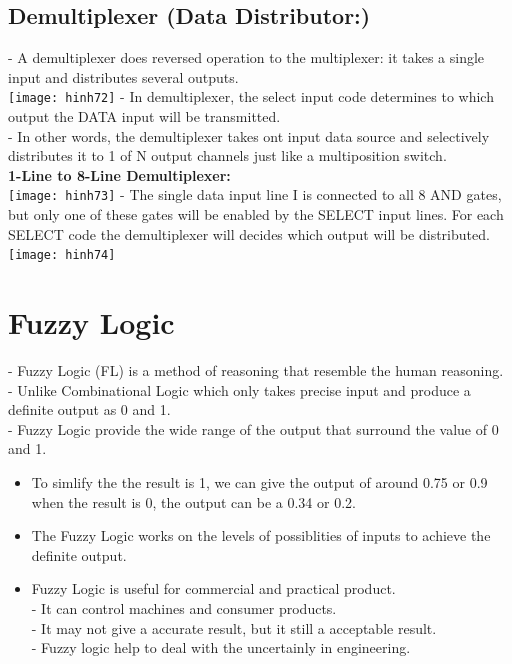 \documentclass[12pt]{article}
\begin{document}
 \subsection{Demultiplexer (Data Distributor:)}
 - A demultiplexer does reversed operation to the multiplexer: it takes a single input and distributes several outputs. \\
 \texttt{[image: hinh72]}
 \bigbreak
 - In demultiplexer, the select input code determines to which output the DATA input will be transmitted. \\
 - In other words, the demultiplexer takes ont input data source and selectively distributes it to 1 of N output channels just like a multiposition switch. \\
 \bigbreak
 \textbf{1-Line to 8-Line Demultiplexer: } \\
 \texttt{[image: hinh73]}
 \bigbreak
 - The single data input line I is connected to all 8 AND gates, but only one of these gates will be enabled by the SELECT input lines. For each SELECT code the demultiplexer will decides which output will be distributed. \\
 \texttt{[image: hinh74]}
 \bigbreak
















\section{Fuzzy Logic}
- Fuzzy Logic (FL) is a method of reasoning that resemble the human reasoning.\\
- Unlike Combinational Logic which only takes precise input and produce a definite output as 0 and 1. \\
- Fuzzy Logic provide the wide range of the output that surround the value of 0 and 1.\\
\begin{itemize}
	\item To simlify the the result is 1, we can give the output of around 0.75 or 0.9 when the result is 0, the output can be a 0.34 or 0.2.
	\item The Fuzzy Logic works on the levels of possiblities of inputs to achieve the definite output.
	\item Fuzzy Logic is useful for commercial and practical product. \\
	- It can control machines and consumer products. \\
	- It may not give a accurate result, but it still a acceptable result. \\
	- Fuzzy logic help to deal with the uncertainly in engineering.
\end{itemize}
\end{document}
